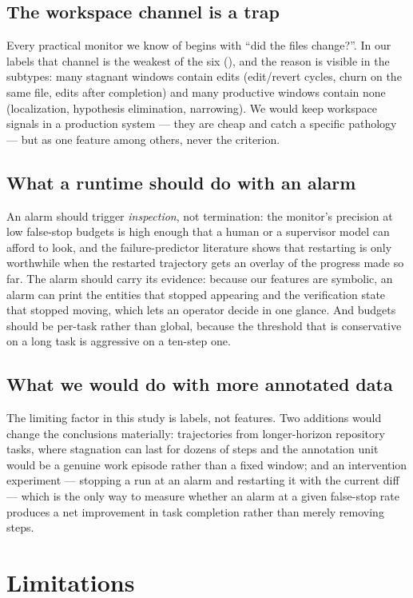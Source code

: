 \subsection{The workspace channel is a trap}
Every practical monitor we know of begins with ``did the files change?''. In our labels that channel is the
weakest of the six (\paucBSevenworkspace{}), and the reason is visible in the subtypes: many stagnant
windows contain edits (edit/revert cycles, churn on the same file, edits after completion) and many
productive windows contain none (localization, hypothesis elimination, narrowing). We would keep workspace
signals in a production system --- they are cheap and catch a specific pathology --- but as one feature
among others, never the criterion.

\subsection{What a runtime should do with an alarm}
An alarm should trigger \emph{inspection}, not termination: the monitor's precision at low false-stop
budgets is high enough that a human or a supervisor model can afford to look, and the failure-predictor
literature shows that restarting is only worthwhile when the restarted trajectory gets an overlay of the
progress made so far. The alarm should carry its evidence: because our features are symbolic, an alarm can
print the entities that stopped appearing and the verification state that stopped moving, which lets an
operator decide in one glance. And budgets should be per-task rather than global, because the threshold
that is conservative on a long task is aggressive on a ten-step one.

\subsection{What we would do with more annotated data}
The limiting factor in this study is labels, not features. Two additions would change the conclusions
materially: trajectories from longer-horizon repository tasks, where stagnation can last for dozens of
steps and the annotation unit would be a genuine work episode rather than a fixed window; and an
intervention experiment --- stopping a run at an alarm and restarting it with the current diff --- which is
the only way to measure whether an alarm at a given false-stop rate produces a net improvement in task
completion rather than merely removing steps.

\section{Limitations}
\label{sec:limits}

